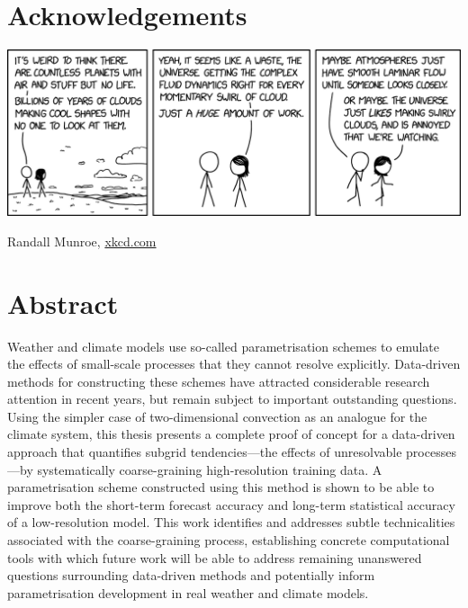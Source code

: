 \documentclass[../main.tex]{subfiles}
\begin{document}
\makeatletter\@openrightfalse\makeatother
\chapter*{Acknowledgements}

\clearpage
\vspace*{\fill}
\begin{center}
    \includegraphics[width=\linewidth]{figures/cloud_swirls.png}

    {
        \footnotesize \color{gray}
        Randall Munroe, \href{https://xkcd.com/2664/}{xkcd.com}
    }
\end{center}
\vfill

\chapter*{Abstract}
Weather and climate models use so-called parametrisation schemes to emulate the
effects of small-scale processes that they cannot resolve explicitly.
Data-driven methods for constructing these schemes have attracted considerable
research attention in recent years, but remain subject to important outstanding
questions. Using the simpler case of two-dimensional \rb{} convection as an
analogue for the climate system, this thesis presents a complete proof of
concept for a data-driven approach that quantifies subgrid tendencies---the
effects of unresolvable processes---by systematically coarse-graining
high-resolution training data. A parametrisation scheme constructed using this
method is shown to be able to improve both the short-term forecast accuracy and
long-term statistical accuracy of a low-resolution model. This work identifies
and addresses subtle technicalities associated with the coarse-graining
process, establishing concrete computational tools with which future work will
be able to address remaining unanswered questions surrounding data-driven
methods and potentially inform parametrisation development in real
weather and climate models.


\tableofcontents

\makeatletter\@openrighttrue\makeatother
\mainmatter
\end{document}
